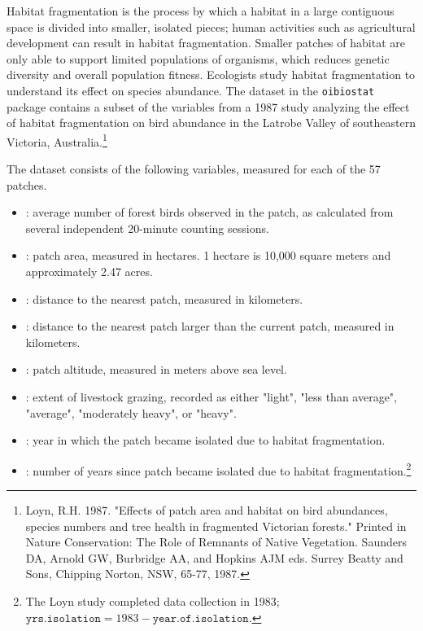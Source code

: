 
Habitat fragmentation is the process by which a habitat in a large contiguous space is divided into smaller, isolated pieces; human activities such as agricultural development can result in habitat fragmentation. Smaller patches of habitat are only able to support limited populations of organisms, which reduces genetic diversity and overall population fitness. Ecologists study habitat fragmentation to understand its effect on species abundance. The  dataset in the \texttt{oibiostat} package contains a subset of the variables from a 1987 study analyzing the effect of habitat fragmentation on bird abundance in the Latrobe Valley of southeastern Victoria, Australia.\footnote{Loyn, R.H. 1987. "Effects of patch area and habitat on bird abundances, species numbers and tree health in fragmented Victorian forests." Printed in Nature Conservation: The Role of Remnants of Native Vegetation. Saunders DA, Arnold GW, Burbridge AA, and Hopkins AJM eds. Surrey Beatty and Sons, Chipping Norton, NSW, 65-77, 1987.}

The dataset consists of the following variables, measured for each of the 57 patches.
\begin{itemize}
  \item {}: average number of forest birds observed in the patch, as calculated from several independent 20-minute counting sessions. 

  \item {}: patch area, measured in hectares. 1 hectare is 10,000 square meters and approximately 2.47 acres.

  \item {}: distance to the nearest patch, measured in kilometers.

  \item {}: distance to the nearest patch larger than the current patch, measured in kilometers.

  \item {}: patch altitude, measured in meters above sea level.

  \item {}: extent of livestock grazing, recorded as either "light", "less than average", "average", "moderately heavy", or "heavy". 

  \item {}: year in which the patch became isolated due to habitat fragmentation.

  \item {}: number of years since patch became isolated due to habitat fragmentation.\footnote{The Loyn study completed data collection in 1983;  $\texttt{yrs.isolation} = 1983 - \texttt{year.of.isolation}$.}
\end{itemize}
 
